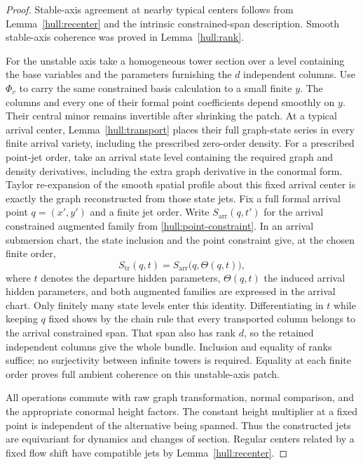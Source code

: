 \begin{proof}
Stable-axis agreement at nearby typical centers follows from
Lemma~\ref{hull:recenter} and the intrinsic constrained-span
description. Smooth stable-axis coherence was proved in
Lemma~\ref{hull:rank}.

For the unstable axis take a homogeneous tower section over a level
containing the base variables and the parameters furnishing the
$d$ independent columns. Use $\Phi_v$ to carry the same constrained
basis calculation to a small finite $y$. The columns and every one
of their formal point coefficients depend smoothly on $y$. Their
central minor remains invertible after shrinking the patch.
At a typical arrival center, Lemma~\ref{hull:transport} places their
full graph-state series in every finite arrival variety, including
the prescribed zero-order density. For a prescribed point-jet order,
take an arrival state level containing the required graph and density
derivatives, including the extra graph derivative in the conormal form.
Taylor re-expansion of the smooth spatial profile about this fixed
arrival center is exactly the graph reconstructed from those state
jets. Fix a full formal arrival point
$q=(x',y')$ and a finite jet order. Write $S_{\mathrm{arr}}(q,t')$
for the arrival constrained augmented family from
\eqref{hull:point-constraint}. In an arrival submersion chart, the
state inclusion and the point constraint give, at the chosen finite
order,
\[
 S_{\mathrm{tr}}(q,t)
   =S_{\mathrm{arr}}\bigl(q,\Theta(q,t)\bigr),
\]
where $t$ denotes the departure hidden parameters, $\Theta(q,t)$
the induced arrival hidden parameters, and both augmented families
are expressed in the arrival chart. Only finitely many state levels
enter this identity. Differentiating in $t$ while keeping $q$ fixed
shows by the chain rule that every transported column belongs to
the arrival constrained span. That span also has rank $d$, so the
retained independent columns give the whole bundle. Inclusion and
equality of ranks suffice; no surjectivity between infinite towers
is required. Equality at each finite order proves full ambient
coherence on this unstable-axis patch.

All operations commute with raw graph transformation, normal
comparison, and the appropriate conormal height factors.
The constant height multiplier at a fixed point is independent of
the alternative being spanned. Thus the constructed jets are
equivariant for dynamics and changes of section. Regular centers
related by a fixed flow shift have compatible jets by
Lemma~\ref{hull:recenter}.


\end{proof}
